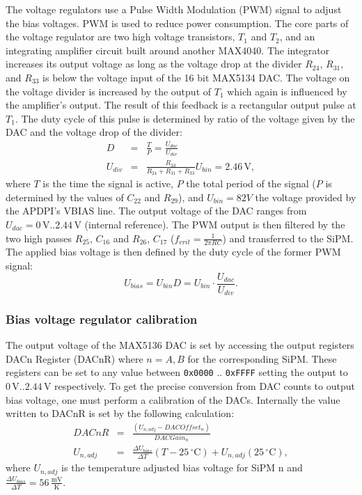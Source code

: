 \documentclass[]{article}
\begin{document}
The voltage regulators use a Pulse Width Modulation (PWM) signal to adjust the bias voltages. PWM is used to reduce power consumption.
The core parts of the voltage regulator are two high voltage transistors, $T_1$ and $T_2$, and an integrating amplifier circuit built around another MAX4040. The integrator increases
its output voltage as long as the voltage drop at the divider $R_{24}$, $R_{31}$, and $R_{33}$ is below the voltage input of the 16 bit MAX5134 DAC.
The voltage on the voltage divider is increased by the output of $T_1$ which again is influenced by the amplifier's output. The result of this feedback is a rectangular output
pulse at $T_1$. The duty cycle of this pulse is determined by ratio of the voltage given by the DAC and the voltage drop of the divider:
	\begin{eqnarray}
		D &=& \frac{T}{P} = \frac{U_{dac}}{U_{div}} \\
		U_{div} &=& \frac{R_{33}}{R_{24} + R_{31} + R_{33}} U_{bin} = 2.46\,\text{V},
	\end{eqnarray}
where $T$ is the time the signal is active, $P$ the total period of the signal ($P$ is determined by the values of $C_{22}$ and $R_{29}$), and $U_{bin}=82V$ the voltage provided by the 
APDPI's VBIAS line. The output voltage of the DAC ranges from $U_{dac}=0\, \text{V} .. 2.44\, \text{V}$ (internal reference). The PWM output is then filtered by the two high passes 
$R_{25}$, $C_{16}$ and $R_{26}$, $C_{17}$ ($f_{crit} = \frac{1}{2 \pi RC}$) and transferred to the SiPM. The applied bias voltage is then defined by the duty cycle of the former 
PWM signal:
	\begin{equation}
		U_{bias} = U_{bin} D = U_{bin} \cdot \frac{U_{dac}}{U_{div}}.
	\end{equation}

\subsubsection*{Bias voltage regulator calibration}

The output voltage of the MAX5136 DAC is set by accessing the output registers DACn Register (DACnR) where $n=A,B$ for the corresponding SiPM. These registers can be set to any value between \verb|0x0000| .. \verb|0xFFFF| setting the output to $0\, \text{V}..2.44\, \text{V}$ respectively. To get the precise conversion from DAC counts to output bias voltage, one must perform a calibration of the DACs. Internally the value written to DACnR is set by the following calculation:
	\begin{eqnarray}
		DACnR &=&  \frac{(U_{n,adj} - DACOffset_{n})}{DACGain_{n}} \\
		U_{n,adj} &=& \frac{\Delta U_{bias}}{\Delta T}(T - 25\,^{\circ} \text{C}) + U_{n,adj}(25\,^{\circ} \text{C}),
	\end{eqnarray} 
where $U_{n,adj}$ is the temperature adjusted bias voltage for SiPM n and $\frac{\Delta U_{bias}}{\Delta T} = 56\,\frac{\text{mV}}{\text{K}}$. 
\end{document}
